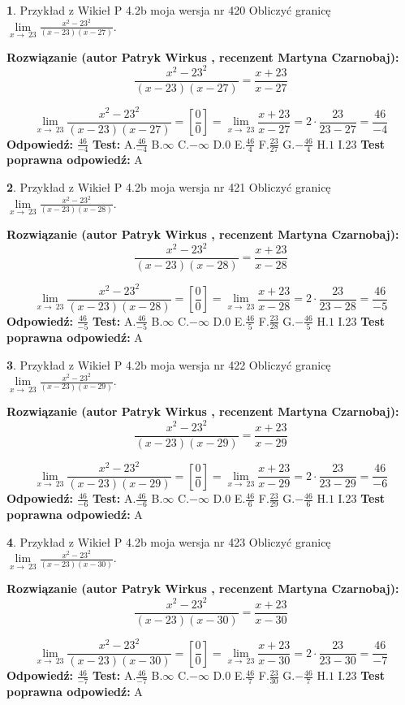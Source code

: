 \documentclass[12pt, a4paper]{article}
\theoremstyle{definition} %
\newtheorem{zad}{}
\newcommand{\zadStart}[1]{\begin{zad}#1\newline}
\newcommand{\zadStop}{\end{zad}}
\newcommand{\rozwStart}[2]{\noindent \textbf{Rozwiązanie (autor #1 , recenzent #2): }\newline}
\newcommand{\rozwStop}{\newline}
\newcommand{\odpStart}{\noindent \textbf{Odpowiedź:}\newline}
\newcommand{\odpStop}{\newline}
\newcommand{\testStart}{\noindent \textbf{Test:}\newline}
\newcommand{\testStop}{\newline}
\newcommand{\kluczStart}{\noindent \textbf{Test poprawna odpowiedź:}\newline}
\newcommand{\kluczStop}{\newline}
\begin{document}
\zadStart{Przykład z Wikieł P 4.2b moja wersja nr 420}
Obliczyć granicę $\lim\limits_{x\to\ 23}\frac{x^{2}-23^{2}}{(x-23)(x-27)}$.
\zadStop
\rozwStart{Patryk Wirkus}{Martyna Czarnobaj}
$$\frac{x^{2}-23^{2}}{(x-23)(x-27)}=\frac{x+23}{x-27}$$

$$\lim\limits_{x\to\ 23}\frac{x^{2}-23^{2}}{(x-23)(x-27)}=[\frac{0}{0}]=\lim\limits_{x\to\ 23}\frac{x+23}{x-27}=2 \cdot \frac{23}{23-27} = \frac{46}{-4}$$
\rozwStop
\odpStart
$\frac{46}{-4}$
\odpStop
\testStart
A.$\frac{46}{-4}$
B.$\infty$
C.$-\infty$
D.$0$
E.$\frac{46}{4}$
F.$\frac{23}{27}$
G.$-\frac{46}{4}$
H.$1$
I.$23$
\testStop
\kluczStart
A
\kluczStop



\zadStart{Przykład z Wikieł P 4.2b moja wersja nr 421}
Obliczyć granicę $\lim\limits_{x\to\ 23}\frac{x^{2}-23^{2}}{(x-23)(x-28)}$.
\zadStop
\rozwStart{Patryk Wirkus}{Martyna Czarnobaj}
$$\frac{x^{2}-23^{2}}{(x-23)(x-28)}=\frac{x+23}{x-28}$$

$$\lim\limits_{x\to\ 23}\frac{x^{2}-23^{2}}{(x-23)(x-28)}=[\frac{0}{0}]=\lim\limits_{x\to\ 23}\frac{x+23}{x-28}=2 \cdot \frac{23}{23-28} = \frac{46}{-5}$$
\rozwStop
\odpStart
$\frac{46}{-5}$
\odpStop
\testStart
A.$\frac{46}{-5}$
B.$\infty$
C.$-\infty$
D.$0$
E.$\frac{46}{5}$
F.$\frac{23}{28}$
G.$-\frac{46}{5}$
H.$1$
I.$23$
\testStop
\kluczStart
A
\kluczStop



\zadStart{Przykład z Wikieł P 4.2b moja wersja nr 422}
Obliczyć granicę $\lim\limits_{x\to\ 23}\frac{x^{2}-23^{2}}{(x-23)(x-29)}$.
\zadStop
\rozwStart{Patryk Wirkus}{Martyna Czarnobaj}
$$\frac{x^{2}-23^{2}}{(x-23)(x-29)}=\frac{x+23}{x-29}$$

$$\lim\limits_{x\to\ 23}\frac{x^{2}-23^{2}}{(x-23)(x-29)}=[\frac{0}{0}]=\lim\limits_{x\to\ 23}\frac{x+23}{x-29}=2 \cdot \frac{23}{23-29} = \frac{46}{-6}$$
\rozwStop
\odpStart
$\frac{46}{-6}$
\odpStop
\testStart
A.$\frac{46}{-6}$
B.$\infty$
C.$-\infty$
D.$0$
E.$\frac{46}{6}$
F.$\frac{23}{29}$
G.$-\frac{46}{6}$
H.$1$
I.$23$
\testStop
\kluczStart
A
\kluczStop



\zadStart{Przykład z Wikieł P 4.2b moja wersja nr 423}
Obliczyć granicę $\lim\limits_{x\to\ 23}\frac{x^{2}-23^{2}}{(x-23)(x-30)}$.
\zadStop
\rozwStart{Patryk Wirkus}{Martyna Czarnobaj}
$$\frac{x^{2}-23^{2}}{(x-23)(x-30)}=\frac{x+23}{x-30}$$

$$\lim\limits_{x\to\ 23}\frac{x^{2}-23^{2}}{(x-23)(x-30)}=[\frac{0}{0}]=\lim\limits_{x\to\ 23}\frac{x+23}{x-30}=2 \cdot \frac{23}{23-30} = \frac{46}{-7}$$
\rozwStop
\odpStart
$\frac{46}{-7}$
\odpStop
\testStart
A.$\frac{46}{-7}$
B.$\infty$
C.$-\infty$
D.$0$
E.$\frac{46}{7}$
F.$\frac{23}{30}$
G.$-\frac{46}{7}$
H.$1$
I.$23$
\testStop
\kluczStart
A
\kluczStop
\end{document}
